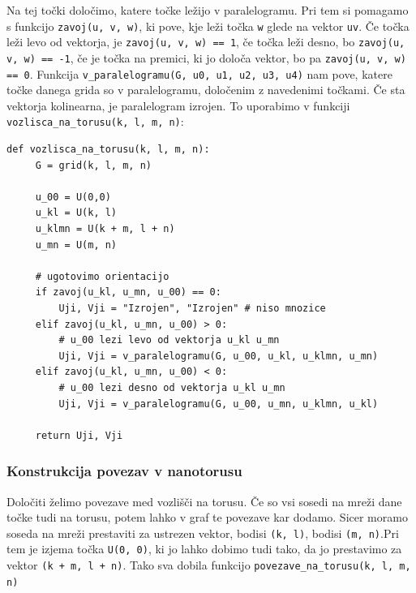 \documentclass[a4paper, 10 pt, titlepage]{article}
\begin{document}
Na tej točki določimo, katere točke ležijo v paralelogramu. Pri tem si pomagamo s funkcijo \texttt{zavoj(u, v, w)}, ki pove, kje leži točka \texttt{w} glede na vektor \texttt{uv}. Če točka leži levo od vektorja, je \texttt{zavoj(u, v, w) == 1}, če točka leži desno, bo \texttt{zavoj(u, v, w) == -1}, če je točka na premici, ki jo določa vektor, bo pa \texttt{zavoj(u, v, w) == 0}. Funkcija \texttt{v\_paralelogramu(G, u0, u1, u2, u3, u4)} nam pove, katere točke danega grida so v paralelogramu, določenim z navedenimi točkami. Če sta vektorja kolinearna, je paralelogram izrojen. To uporabimo v funkciji \texttt{vozlisca\_na\_torusu(k, l, m, n)}:

\begin{verbatim}
def vozlisca_na_torusu(k, l, m, n):
     G = grid(k, l, m, n)
    
     u_00 = U(0,0)
     u_kl = U(k, l)
     u_klmn = U(k + m, l + n)
     u_mn = U(m, n)

     # ugotovimo orientacijo
     if zavoj(u_kl, u_mn, u_00) == 0:
         Uji, Vji = "Izrojen", "Izrojen" # niso mnozice
     elif zavoj(u_kl, u_mn, u_00) > 0:
         # u_00 lezi levo od vektorja u_kl u_mn
         Uji, Vji = v_paralelogramu(G, u_00, u_kl, u_klmn, u_mn)
     elif zavoj(u_kl, u_mn, u_00) < 0:
         # u_00 lezi desno od vektorja u_kl u_mn
         Uji, Vji = v_paralelogramu(G, u_00, u_mn, u_klmn, u_kl)
    
     return Uji, Vji
\end{verbatim}

\subsubsection{Konstrukcija povezav v nanotorusu}

Določiti želimo povezave med vozlišči na torusu. Če so vsi sosedi na mreži dane točke tudi na torusu, potem lahko v graf te povezave kar dodamo. Sicer moramo soseda na mreži prestaviti za ustrezen vektor, bodisi \texttt{(k, l)}, bodisi \texttt{(m, n)}.Pri tem je izjema točka \texttt{U(0, 0)}, ki jo lahko dobimo tudi tako, da jo prestavimo za vektor \texttt{(k + m, l + n)}.  Tako sva dobila funkcijo \texttt{povezave\_na\_torusu(k, l, m, n)}
\end{document}
